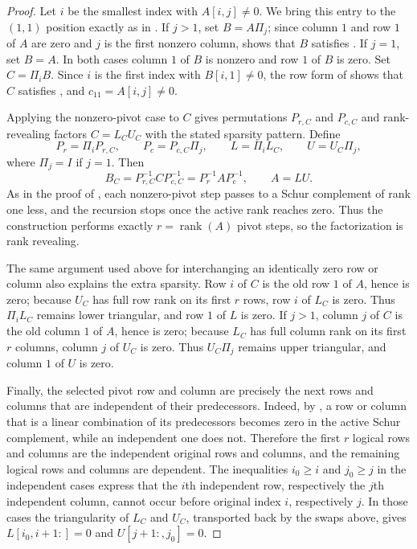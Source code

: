 \documentclass[final]{siamart1116}
\numberwithin{theorem}{section}
\DeclareMathOperator{\rk}{rank}
\begin{document}
\begin{proof}
  Let $i$ be the smallest index with $A[i,j] \neq 0$. We bring this entry to the $(1,1)$ position exactly as in . If $j > 1$, set $B = A\Pi_j$; since column $1$ and row $1$ of $A$ are zero and $j$ is the first nonzero column,  shows that $B$ satisfies . If $j=1$, set $B=A$. In both cases column $1$ of $B$ is nonzero and row $1$ of $B$ is zero. Set $C=\Pi_i B$. Since $i$ is the first index with $B[i,1]\neq0$, the row form of  shows that $C$ satisfies , and $c_{11}=A[i,j]\neq0$.

  Applying the nonzero-pivot case to $C$ gives permutations $P_{r,C}$ and $P_{c,C}$ and rank-revealing factors $C=L_CU_C$ with the stated sparsity pattern. Define
  \[
    P_r = \Pi_i P_{r,C}, \qquad
    P_c = P_{c,C}\Pi_j, \qquad
    L = \Pi_i L_C, \qquad
    U = U_C\Pi_j,
  \]
  where $\Pi_j=I$ if $j=1$. Then
  \[
    B_C = P_{r,C}^{-1} C P_{c,C}^{-1}
    = P_r^{-1} A P_c^{-1},
    \qquad
    A = LU.
  \]
  As in the proof of , each nonzero-pivot step passes to a Schur complement of rank one less, and the recursion stops once the active rank reaches zero. Thus the construction performs exactly $r = \rk(A)$ pivot steps, so the factorization is rank revealing.

  The same argument used above for interchanging an identically zero row or column also explains the extra sparsity. Row $i$ of $C$ is the old row $1$ of $A$, hence is zero; because $U_C$ has full row rank on its first $r$ rows, row $i$ of $L_C$ is zero. Thus $\Pi_i L_C$ remains lower triangular, and row $1$ of $L$ is zero. If $j>1$, column $j$ of $C$ is the old column $1$ of $A$, hence is zero; because $L_C$ has full column rank on its first $r$ columns, column $j$ of $U_C$ is zero. Thus $U_C\Pi_j$ remains upper triangular, and column $1$ of $U$ is zero.

  Finally, the selected pivot row and column are precisely the next rows and columns that are independent of their predecessors. Indeed, by , a row or column that is a linear combination of its predecessors becomes zero in the active Schur complement, while an independent one does not. Therefore the first $r$ logical rows and columns are the independent original rows and columns, and the remaining logical rows and columns are dependent. The inequalities $i_0 \ge i$ and $j_0 \ge j$ in the independent cases express that the $i$th independent row, respectively the $j$th independent column, cannot occur before original index $i$, respectively $j$. In those cases the triangularity of $L_C$ and $U_C$, transported back by the swaps above, gives $L[i_0,i+1:]=0$ and $U[j+1:,j_0]=0$.


\end{proof}
\end{document}
